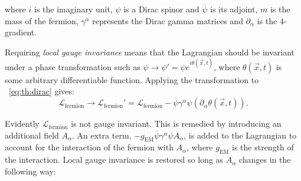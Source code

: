 where $i$ is the imaginary unit, $\psi$ is a Dirac spinor and $\overline{\psi}$ is its adjoint, $m$ is the mass of the fermion, $\gamma^{\alpha}$ represents the Dirac gamma matrices and $\partial_{\alpha}$ is the 4-gradient. 

Requiring \emph{local gauge invariance} means that the Lagrangian should be  invariant under a phase transformation such as
$\psi \rightarrow \psi'= \psi e^{i\theta(\vec{x},t)}$, where $\theta(\vec{x},t)$ is some arbitrary differentiable function. Applying the transformation to \Eq~\ref{eq:th:dirac} gives:
\begin{equation}
\label{eq:th:dirac_lagrangian_not_invariant_local_gauge_transf}
\mathcal{L}_{\textrm{fermion}} \rightarrow \mathcal{L}_{\textrm{fermion}}'=  \mathcal{L}_{\textrm{fermion}} - \overline{\psi} \gamma^{\alpha} \psi (\partial_{\alpha} \theta(\vec{x},t)).
\end{equation}

Evidently $\mathcal{L}_{\textrm{fermion}}$ is not gauge invariant.
This is remedied by introducing an additional field $A_\alpha$. An extra term, $- g_{\textrm{EM}}\overline{\psi}\gamma^{\alpha}\psi A_{\alpha}$, is added to the Lagrangian to account for the interaction of the fermion with $A_\alpha$,
where $g_{\textrm{EM}}$ is the strength of the interaction. Local gauge invariance is restored so long as $A_\alpha$ changes in the following way: 

